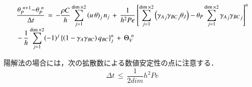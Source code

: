 \begin{equation}
\begin{array}{l}
\displaystyle { \frac{{\mathit{\theta}}_{P}^{\hspace{0.3em}{n}\mathrm{{+}}{1}}\mathrm{{-}}{\mathit{\theta}}_{P}^{\hspace{0.3em}{n}}}{\mathrm{\Delta}{t}}
\,=\, -
\frac{\rho C}{h} \sum\limits_{j=1}^{\dim\times2} {\left( u\,\theta \right)}_j \,n_j
\, + \,
\frac{1}{h^{2}Pe} \left[ \sum\limits_{j=1}^{\dim\times2} \left( {\gamma_{A}}_{j} {\gamma_{BC}}_{j} \theta_{J} \right)- \theta_{P} \sum\limits_{j=1}^{\dim\times2} {\gamma_{A}}_{j} {\gamma_{BC}}_{j} \right]^{n} }\\
\displaystyle { \,-\,
\frac{1}{h} \sum\limits_{j=1}^{\dim\times2} (-1)^{j} \left\{ \left(1-\gamma_{A} \gamma_{BC} \right) q_{BC} \right\}_{j}^{n}
\,+\, \Theta_{V}^{\hspace{0.3em}n} }
\end{array}
\label{eq:pscalar ee2}
\end{equation}

\noindent 陽解法の場合には，次の拡散数による数値安定性の点に注意する．
\begin{equation}
\Delta t \,\le\, \frac{1}{2dim}h^{2}Pe
\label{eq:pscalar ee3}
\end{equation}

